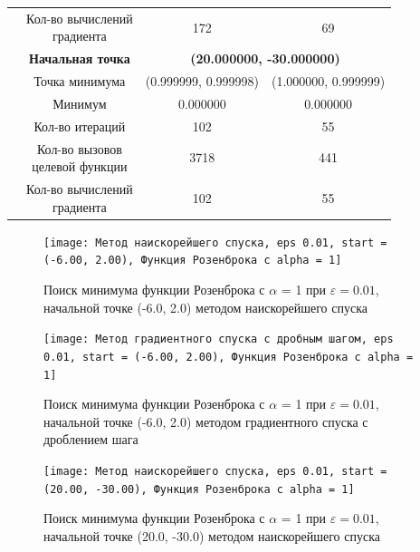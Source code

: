\begin{table}[H]
\begin{tabular}{|c|c|c|c|}
	\cline{2-4}
	&\makecell{Кол-во вычислений\\градиента} &172 &69 \\ 
	\cline{2-4}
\cline{2-4}&\textbf{Начальная точка} &\multicolumn{2}{c|}{\textbf{(20.000000, -30.000000)}}\\
	\cline{2-4}
	&Точка минимума &(0.999999, 0.999998) &(1.000000, 0.999999) \\ 
	\cline{2-4}
	&Минимум &0.000000 &0.000000 \\ 
	\cline{2-4}
	&Кол-во итераций &102 &55 \\ 
	\cline{2-4}
	&\makecell{Кол-во вызовов\\целевой функции} &3718 &441 \\ 
	\cline{2-4}
	&\makecell{Кол-во вычислений\\градиента} &102 &55 \\ 
	\cline{2-4}
	\hline

\end{tabular}
\end{table}


            \begin{figure}[H]
	        \centering
	        \texttt{[image: Метод наискорейшего спуска, eps 0.01, start = (-6.00, 2.00), Функция Розенброка с alpha = 1]}%
	        \caption{Поиск минимума функции Розенброка с $\alpha$ = 1 при $\varepsilon = 0.01$, начальной точке (-6.0, 2.0) методом наискорейшего спуска}
	        \vspace*{-1.2cm}
            \end{figure}
            
            \begin{figure}[H]
	        \centering
	        \texttt{[image: Метод градиентного спуска с дробным шагом, eps 0.01, start = (-6.00, 2.00), Функция Розенброка с alpha = 1]}%
	        \caption{Поиск минимума функции Розенброка с $\alpha$ = 1 при $\varepsilon = 0.01$, начальной точке (-6.0, 2.0) методом градиентного спуска с дроблением шага}
	        \vspace*{-1.2cm}
            \end{figure}
            
            \begin{figure}[H]
	        \centering
	        \texttt{[image: Метод наискорейшего спуска, eps 0.01, start = (20.00, -30.00), Функция Розенброка с alpha = 1]}%
	        \caption{Поиск минимума функции Розенброка с $\alpha$ = 1 при $\varepsilon = 0.01$, начальной точке (20.0, -30.0) методом наискорейшего спуска}
	        \vspace*{-1.2cm}
            \end{figure}
            
